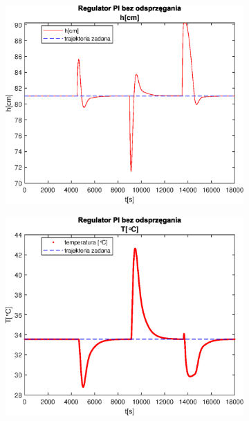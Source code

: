 \begin{figure}[h!]
   \centering
   \begin{subfigure}[b]{0.4\textwidth}
      \includegraphics[width=1\linewidth]{img/PI/noDecoupler/disturbance/PINoDecouplerH2DisttrueLinfalse.eps}
      \caption{}
      \label{fig:fig:PIDecoupler2DisttrueLinfalse1}
   \end{subfigure}
       
   \begin{subfigure}[b]{0.4\textwidth}
      \includegraphics[width=1\linewidth]{img/PI/noDecoupler/disturbance/PINoDecouplerT2DisttrueLinfalse.eps}
      \caption{}
      \label{fig:fig:PIDecoupler2DisttrueLinfalse2}
   \end{subfigure}
       

\end{figure}
